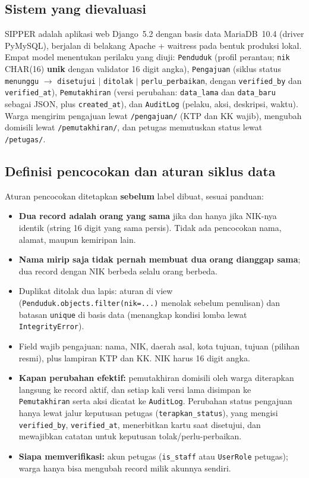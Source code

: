 \documentclass[11pt,a4paper]{article}
\begin{document}
\subsection{Sistem yang dievaluasi}

SIPPER adalah aplikasi web Django~5.2 dengan basis data MariaDB~10.4 (driver PyMySQL), berjalan di belakang Apache + waitress pada bentuk produksi lokal. Empat model menentukan perilaku yang diuji: \texttt{Penduduk} (profil perantau; \texttt{nik} CHAR(16) \textbf{unik} dengan validator 16 digit angka), \texttt{Pengajuan} (siklus status \texttt{menunggu} $\rightarrow$ \texttt{disetujui} $|$ \texttt{ditolak} $|$ \texttt{perlu\_perbaikan}, dengan \texttt{verified\_by} dan \texttt{verified\_at}), \texttt{Pemutakhiran} (versi perubahan: \texttt{data\_lama} dan \texttt{data\_baru} sebagai JSON, plus \texttt{created\_at}), dan \texttt{AuditLog} (pelaku, aksi, deskripsi, waktu). Warga mengirim pengajuan lewat \texttt{/pengajuan/} (KTP dan KK wajib), mengubah domisili lewat \texttt{/pemutakhiran/}, dan petugas memutuskan status lewat \texttt{/petugas/}.

\subsection{Definisi pencocokan dan aturan siklus data}

Aturan pencocokan ditetapkan \textbf{sebelum} label dibuat, sesuai panduan:
\begin{itemize}
  \item \textbf{Dua record adalah orang yang sama} jika dan hanya jika NIK-nya identik (string 16 digit yang sama persis). Tidak ada pencocokan nama, alamat, maupun kemiripan lain.
  \item \textbf{Nama mirip saja tidak pernah membuat dua orang dianggap sama}; dua record dengan NIK berbeda selalu orang berbeda.
  \item Duplikat ditolak dua lapis: aturan di view (\texttt{Penduduk.objects.filter(nik=...)} menolak sebelum penulisan) dan batasan \texttt{unique} di basis data (menangkap kondisi lomba lewat \texttt{IntegrityError}).
  \item Field wajib pengajuan: nama, NIK, daerah asal, kota tujuan, tujuan (pilihan resmi), plus lampiran KTP dan KK. NIK harus 16 digit angka.
  \item \textbf{Kapan perubahan efektif:} pemutakhiran domisili oleh warga diterapkan langsung ke record aktif, dan setiap kali versi lama disimpan ke \texttt{Pemutakhiran} serta aksi dicatat ke \texttt{AuditLog}. Perubahan status pengajuan hanya lewat jalur keputusan petugas (\texttt{terapkan\_status}), yang mengisi \texttt{verified\_by}, \texttt{verified\_at}, menerbitkan kartu saat disetujui, dan mewajibkan catatan untuk keputusan tolak/perlu-perbaikan.
  \item \textbf{Siapa memverifikasi:} akun petugas (\texttt{is\_staff} atau \texttt{UserRole} petugas); warga hanya bisa mengubah record milik akunnya sendiri.
\end{itemize}
\end{document}
